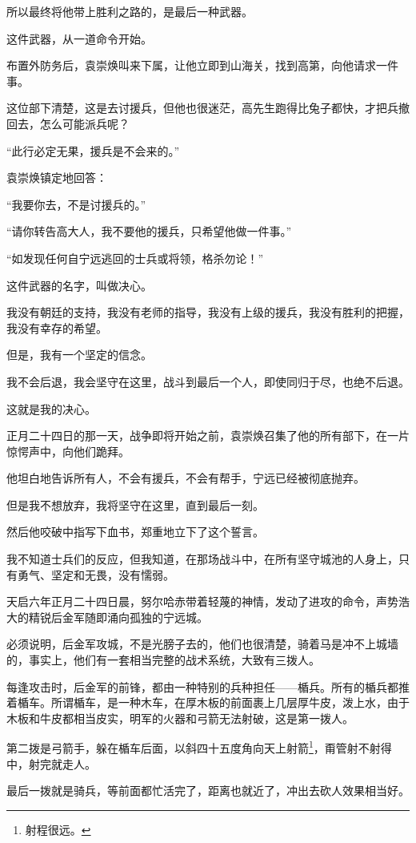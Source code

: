 \begin{multicols}{\theparacolNo}
		所以最终将他带上胜利之路的，是最后一种武器。

		这件武器，从一道命令开始。

		布置外防务后，袁崇焕叫来下属，让他立即到山海关，找到高第，向他请求一件事。

		这位部下清楚，这是去讨援兵，但他也很迷茫，高先生跑得比兔子都快，才把兵撤回去，怎么可能派兵呢？

		“此行必定无果，援兵是不会来的。”

		袁崇焕镇定地回答：

		“我要你去，不是讨援兵的。”

		“请你转告高大人，我不要他的援兵，只希望他做一件事。”

		“如发现任何自宁远逃回的士兵或将领，格杀勿论！”

		这件武器的名字，叫做决心。

		我没有朝廷的支持，我没有老师的指导，我没有上级的援兵，我没有胜利的把握，我没有幸存的希望。

		但是，我有一个坚定的信念。

		我不会后退，我会坚守在这里，战斗到最后一个人，即使同归于尽，也绝不后退。

		这就是我的决心。

		正月二十四日的那一天，战争即将开始之前，袁崇焕召集了他的所有部下，在一片惊愕声中，向他们跪拜。

		他坦白地告诉所有人，不会有援兵，不会有帮手，宁远已经被彻底抛弃。

		但是我不想放弃，我将坚守在这里，直到最后一刻。

		然后他咬破中指写下血书，郑重地立下了这个誓言。

		我不知道士兵们的反应，但我知道，在那场战斗中，在所有坚守城池的人身上，只有勇气、坚定和无畏，没有懦弱。

		天启六年正月二十四日晨，努尔哈赤带着轻蔑的神情，发动了进攻的命令，声势浩大的精锐后金军随即涌向孤独的宁远城。

		必须说明，后金军攻城，不是光膀子去的，他们也很清楚，骑着马是冲不上城墙的，事实上，他们有一套相当完整的战术系统，大致有三拨人。

		每逢攻击时，后金军的前锋，都由一种特别的兵种担任——楯兵。所有的楯兵都推着楯车。所谓楯车，是一种木车，在厚木板的前面裹上几层厚牛皮，泼上水，由于木板和牛皮都相当皮实，明军的火器和弓箭无法射破，这是第一拨人。

		第二拨是弓箭手，躲在楯车后面，以斜四十五度角向天上射箭\footnote{射程很远。}，甭管射不射得中，射完就走人。

		最后一拨就是骑兵，等前面都忙活完了，距离也就近了，冲出去砍人效果相当好。


\end{multicols}
